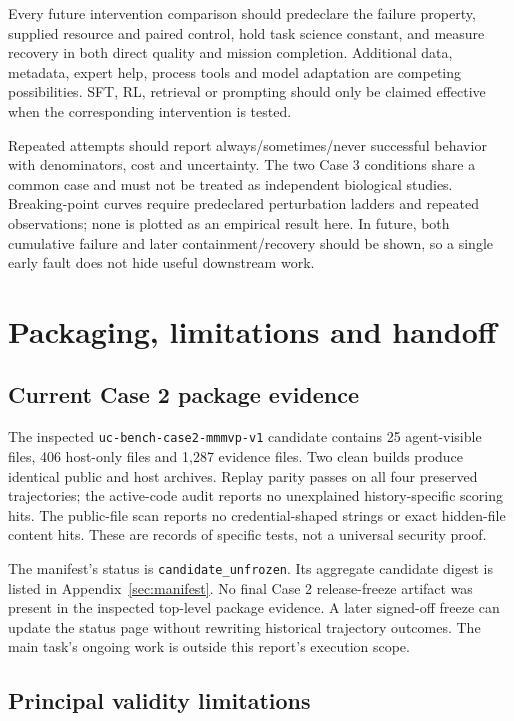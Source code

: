 \documentclass[11pt,a4paper]{article}
\begin{document}
Every future intervention comparison should predeclare the failure property, supplied resource and paired control, hold task science constant, and measure recovery in both direct quality and mission completion. Additional data, metadata, expert help, process tools and model adaptation are competing possibilities. SFT, RL, retrieval or prompting should only be claimed effective when the corresponding intervention is tested.

Repeated attempts should report always/sometimes/never successful behavior with denominators, cost and uncertainty. The two Case 3 conditions share a common case and must not be treated as independent biological studies. Breaking-point curves require predeclared perturbation ladders and repeated observations; none is plotted as an empirical result here. In future, both cumulative failure and later containment/recovery should be shown, so a single early fault does not hide useful downstream work.

\section{Packaging, limitations and handoff}

\subsection{Current Case 2 package evidence}

The inspected \texttt{uc-bench-case2-mmmvp-v1} candidate contains 25 agent-visible files, 406 host-only files and 1,287 evidence files. Two clean builds produce identical public and host archives. Replay parity passes on all four preserved trajectories; the active-code audit reports no unexplained history-specific scoring hits. The public-file scan reports no credential-shaped strings or exact hidden-file content hits. These are records of specific tests, not a universal security proof.\cite{c2package}

The manifest's status is \texttt{candidate\_unfrozen}. Its aggregate candidate digest is listed in Appendix~\ref{sec:manifest}. No final Case 2 release-freeze artifact was present in the inspected top-level package evidence. A later signed-off freeze can update the status page without rewriting historical trajectory outcomes. The main task's ongoing work is outside this report's execution scope.

\subsection{Principal validity limitations}
\end{document}
